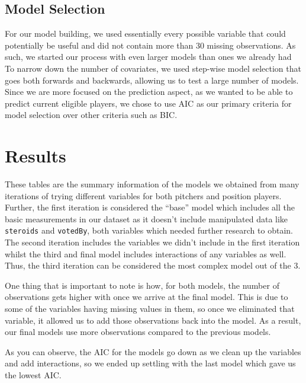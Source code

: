 \documentclass[
]{article}
\begin{document}
\hypertarget{model-selection}{%
\subsection{Model Selection}\label{model-selection}}

For our model building, we used essentially every possible variable that
could potentially be useful and did not contain more than 30 missing
observations. As such, we started our process with even larger models
than ones we already had To narrow down the number of covariates, we
used step-wise model selection that goes both forwards and backwards,
allowing us to test a large number of models. Since we are more focused
on the prediction aspect, as we wanted to be able to predict current
eligible players, we chose to use AIC as our primary criteria for model
selection over other criteria such as BIC.

\hypertarget{results}{%
\section{Results}\label{results}}

These tables are the summary information of the models we obtained from
many iterations of trying different variables for both pitchers and
position players. Further, the first iteration is considered the
``base'' model which includes all the basic measurements in our dataset
as it doesn't include manipulated data like \texttt{steroids} and
\texttt{votedBy}, both variables which needed further research to
obtain. The second iteration includes the variables we didn't include in
the first iteration whilst the third and final model includes
interactions of any variables as well. Thus, the third iteration can be
considered the most complex model out of the 3.

One thing that is important to note is how, for both models, the number
of observations gets higher with once we arrive at the final model. This
is due to some of the variables having missing values in them, so once
we eliminated that variable, it allowed us to add those observations
back into the model. As a result, our final models use more observations
compared to the previous models.

As you can observe, the AIC for the models go down as we clean up the
variables and add interactions, so we ended up settling with the last
model which gave us the lowest AIC.
\end{document}
